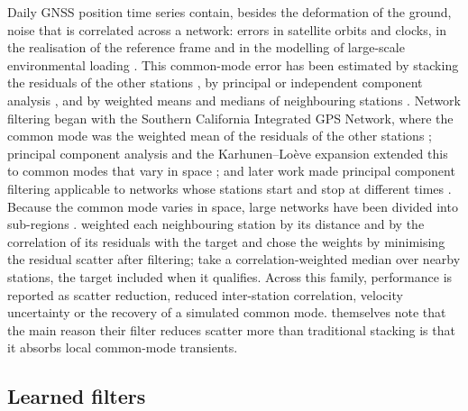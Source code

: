 \documentclass[preprint,12pt,authoryear]{elsarticle}
\begin{document}
Daily GNSS position time series contain, besides the deformation of the ground, noise that is correlated across a network: errors in satellite orbits and clocks, in the realisation of the reference frame and in the modelling of large-scale environmental loading \citep{wdowinski1997, dong2006, kreemer2021}. This common-mode error has been estimated by stacking the residuals of the other stations \citep{wdowinski1997}, by principal or independent component analysis \citep{dong2006, gruszczynski2018, zhou2022}, and by weighted means and medians of neighbouring stations \citep{tianshen2016, kreemer2021}. Network filtering began with the Southern California Integrated GPS Network, where the common mode was the weighted mean of the residuals of the other stations \citep{wdowinski1997}; principal component analysis and the Karhunen--Lo\`eve expansion extended this to common modes that vary in space \citep{dong2006}; and later work made principal component filtering applicable to networks whose stations start and stop at different times \citep{shen2014, gruszczynski2018, li2020vbpca}. Because the common mode varies in space, large networks have been divided into sub-regions \citep{liu2026}. \citet{tianshen2016} weighted each neighbouring station by its distance and by the correlation of its residuals with the target and chose the weights by minimising the residual scatter after filtering; \citet{kreemer2021} take a correlation-weighted median over nearby stations, the target included when it qualifies. Across this family, performance is reported as scatter reduction, reduced inter-station correlation, velocity uncertainty or the recovery of a simulated common mode. \citet{kreemer2021} themselves note that the main reason their filter reduces scatter more than traditional stacking is that it absorbs local common-mode transients.

\subsection{Learned filters}
\end{document}
